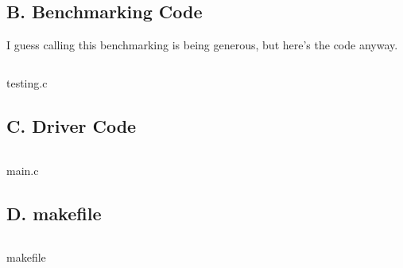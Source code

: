 \documentclass[a4paper]{article}
\newenvironment{code}{\captionsetup{type=listing}}{}
\begin{document}
\subsection*{B. Benchmarking Code}
I guess calling this benchmarking is being generous, but here's the
code anyway.
\begin{code}
\inputminted[samepage=false, breaklines, linenos]{c}{src/testing.c}
\label{lst:testing_src}
\caption{testing.c}
\end{code}      

\subsection*{C. Driver Code}
\begin{code}
\inputminted[samepage=false, breaklines, linenos]{c}{src/main.c}
\label{lst:main_c}
\caption{main.c}
\end{code}      

\subsection*{D. makefile}
\begin{code}
\inputminted[samepage=false, breaklines]{make}{src/makefile}
\label{lst:makefile}
\caption{makefile}
\end{code}      
\end{document}
